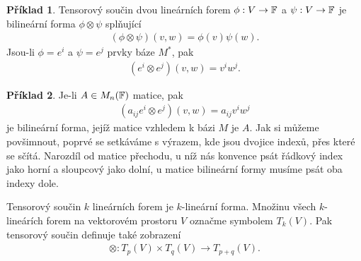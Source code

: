 \documentclass[a4paper,11pt]{report}
\theoremstyle{theorem}
\theoremstyle{remark}
\theoremstyle{definition}
\newtheorem*{example}{Příklad}
\begin{document}
			\begin{example}
				Tensorový součin dvou lineárních forem $\phi : V \to {\mathbb F}$ a $\psi : V \to {\mathbb F}$ je bilineární forma $\phi \otimes \psi$ splňující
				\begin{align*}
					(\phi \otimes \psi)(v,w) = \phi(v) \psi(w).
				\end{align*}
				Jsou-li $\phi = e^i$ a $\psi = e^j$ prvky báze $M^*$, pak
				\begin{align*}
					(e^i \otimes e^j)(v,w) = v^i w^j.
				\end{align*}
			\end{example}
			\begin{example}
				Je-li $A \in M_n({\mathbb F})$ matice, pak
				\begin{align*}
					(a_{ij}e^i \otimes e^j)(v,w) = a_{ij} v^i w^j
				\end{align*}
				je bilineární forma, jejíž matice vzhledem k bázi $M$ je $A$. Jak si můžeme povšimnout, poprvé se setkáváme s výrazem, kde jsou dvojice indexů, přes které se sčítá. Narozdíl od matice přechodu, u níž nás konvence  psát řádkový index jako horní a sloupcový jako dolní, u matice bilineární formy musíme psát oba indexy dole.
			\end{example}
			
			Tensorový součin $k$ lineárních forem je $k$-lineární forma. Množinu všech $k$-lineárích forem na vektorovém prostoru $V$ označme symbolem $T_k(V)$. Pak tensorový součin definuje také zobrazení
			\begin{align*}
				\otimes : T_p(V) \times T_q(V) \to T_{p+q}(V).
			\end{align*}
			
\end{document}
